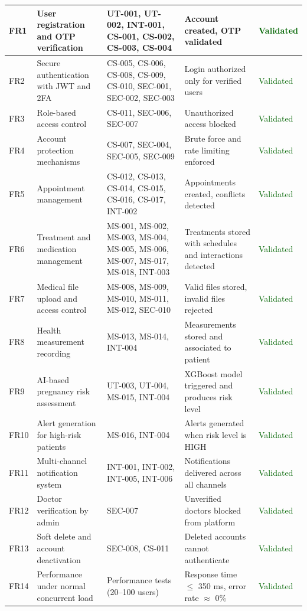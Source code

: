 \begin{longtable}{|p{0.8cm}|p{3.5cm}|p{4cm}|p{2.5cm}|p{1.7cm}|}
FR1 & User registration and OTP verification & UT-001, UT-002, INT-001, CS-001, CS-002, CS-003, CS-004 & Account created, OTP validated & \textcolor{darkgreen}{Validated} \\
\hline
FR2 & Secure authentication with JWT and 2FA & CS-005, CS-006, CS-008, CS-009, CS-010, SEC-001, SEC-002, SEC-003 & Login authorized only for verified users & \textcolor{darkgreen}{Validated} \\
\hline
FR3 & Role-based access control & CS-011, SEC-006, SEC-007 & Unauthorized access blocked & \textcolor{darkgreen}{Validated} \\
\hline
FR4 & Account protection mechanisms & CS-007, SEC-004, SEC-005, SEC-009 & Brute force and rate limiting enforced & \textcolor{darkgreen}{Validated} \\
\hline
FR5 & Appointment management & CS-012, CS-013, CS-014, CS-015, CS-016, CS-017, INT-002 & Appointments created, conflicts detected & \textcolor{darkgreen}{Validated} \\
\hline
FR6 & Treatment and medication management & MS-001, MS-002, MS-003, MS-004, MS-005, MS-006, MS-007, MS-017, MS-018, INT-003 & Treatments stored with schedules and interactions detected & \textcolor{darkgreen}{Validated} \\
\hline
FR7 & Medical file upload and access control & MS-008, MS-009, MS-010, MS-011, MS-012, SEC-010 & Valid files stored, invalid files rejected & \textcolor{darkgreen}{Validated} \\
\hline
FR8 & Health measurement recording & MS-013, MS-014, INT-004 & Measurements stored and associated to patient & \textcolor{darkgreen}{Validated} \\
\hline
FR9 & AI-based pregnancy risk assessment & UT-003, UT-004, MS-015, INT-004 & XGBoost model triggered and produces risk level & \textcolor{darkgreen}{Validated} \\
\hline
FR10 & Alert generation for high-risk patients & MS-016, INT-004 & Alerts generated when risk level is HIGH & \textcolor{darkgreen}{Validated} \\
\hline
FR11 & Multi-channel notification system & INT-001, INT-002, INT-005, INT-006 & Notifications delivered across all channels & \textcolor{darkgreen}{Validated} \\
\hline
FR12 & Doctor verification by admin & SEC-007 & Unverified doctors blocked from platform & \textcolor{darkgreen}{Validated} \\
\hline
FR13 & Soft delete and account deactivation & SEC-008, CS-011 & Deleted accounts cannot authenticate & \textcolor{darkgreen}{Validated} \\
\hline
FR14 & Performance under normal concurrent load & Performance tests (20--100 users) & Response time $\leq$ 350 ms, error rate $\approx$ 0\% & \textcolor{darkgreen}{Validated} \\
\hline
\end{longtable}


